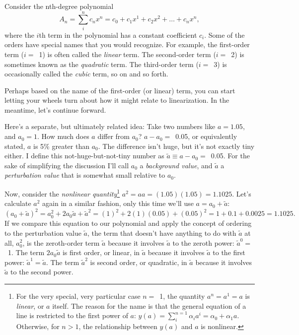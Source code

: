 Consider the nth-degree polynomial
\begin{equation*}
  A_n = \sum\limits_i^n c_n x^n = c_0 + c_1 x^1 + c_2 x^2 + \dots + c_n x^n,
\end{equation*}
where the $i$th term in the polynomial has a constant coefficient $c_i$. Some of
the orders have special names that you would recognize. For example, the
first-order term ($i =$~1) is often called the \emph{linear} term. The
second-order term ($i =$~2) is sometimes known as the \emph{quadratic} term. The
third-order term ($i =$~3) is occasionally called the \emph{cubic} term, so on
and so forth.

Perhaps based on the name of the first-order (or linear) term, you can start
letting your wheels turn about how it might relate to linearization. In the
meantime, let's continue forward.

Here's a separate, but ultimately related idea: Take two numbers like
$a = 1.05$, and $a_0 = 1$. How much does $a$ differ from $a_0$?
$a - a_0 =$~0.05, or equivalently stated, $a$ is 5\% greater than $a_0$. The
difference isn't huge, but it's not exactly tiny either. I define this
not-huge-but-not-tiny number as $ \tilde a \equiv a - a_0 =$~0.05. For the sake
of simplifying the discussion I'll call $a_0$ a \emph{background value}, and
$\tilde a$ a \emph{perturbation value} that is somewhat small relative to $a_0$.

Now, consider the \emph{nonlinear quantity}\footnote{For the very special, very
  particular case $n =$~1, the quantity $a^n = a^1 = a$ is \emph{linear}, or $a$
  itself. The reason for the name is that the general equation of a line is
  restricted to the first power of $a$:
  $y(a) = \sum_i^{n=1} \alpha_i a^i = \alpha_0 + \alpha_1 a$. Otherwise, for
  $n > 1$, the relationship between $y(a)$ and $a$ is nonlinear.}
$a^2 = a a = (1.05)(1.05) = 1.1025$. Let's calculate $a^2$ again in a similar
fashion, only this time we'll use $a = a_0 + \tilde a$:
\begin{equation*}
  (a_0 + \tilde a)^2 = a_0^2 + 2 a_0 \tilde a + {\tilde a}^2 = (1)^2 + 2(1)(0.05) + (0.05)^2 = 1 + 0.1 + 0.0025 = 1.1025.
\end{equation*}
If we compare this equation to our polynomial and apply the concept of ordering
to the perturbation value $\tilde a$, the term that doesn't have anything to do
with $\tilde a$ at all, $a_0^2$, is the zeroth-order term $\tilde a$ because it
involves $\tilde a$ to the zeroth power: $\tilde a^0 =$~1. The term
$2 a_0 \tilde a$ is first order, or linear, in $\tilde a$ because it involves
$\tilde a$ to the first power: $\tilde a^1 =\tilde a$. The term $\tilde a^2$ is
second order, or quadratic, in $\tilde a$ because it involves $\tilde a$ to
the second power.

